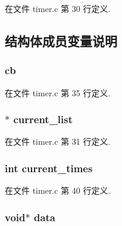 在文件 timer.\+c 第 30 行定义.



\subsection{结构体成员变量说明}
\hypertarget{struct__ktimer__t_a4009fd19bb25e5ed5e9b971db1d62a98}{}
\subsubsection[{cb}]{ cb}\label{struct__ktimer__t_a4009fd19bb25e5ed5e9b971db1d62a98}


在文件 timer.\+c 第 35 行定义.

\hypertarget{struct__ktimer__t_a8621a5cdd71a0fb2a93c75ad076f43af}{}
\subsubsection[{current\+\_\+list}]{$\ast$ current\+\_\+list}\label{struct__ktimer__t_a8621a5cdd71a0fb2a93c75ad076f43af}


在文件 timer.\+c 第 31 行定义.

\hypertarget{struct__ktimer__t_a3ac569d3fe93e34db02d334b0515146e}{}
\subsubsection[{current\+\_\+times}]{\setlength{\rightskip}{0pt plus 5cm}int current\+\_\+times}\label{struct__ktimer__t_a3ac569d3fe93e34db02d334b0515146e}


在文件 timer.\+c 第 40 行定义.

\hypertarget{struct__ktimer__t_a735984d41155bc1032e09bece8f8d66d}{}
\subsubsection[{data}]{\setlength{\rightskip}{0pt plus 5cm}void$\ast$ data}\label{struct__ktimer__t_a735984d41155bc1032e09bece8f8d66d}


